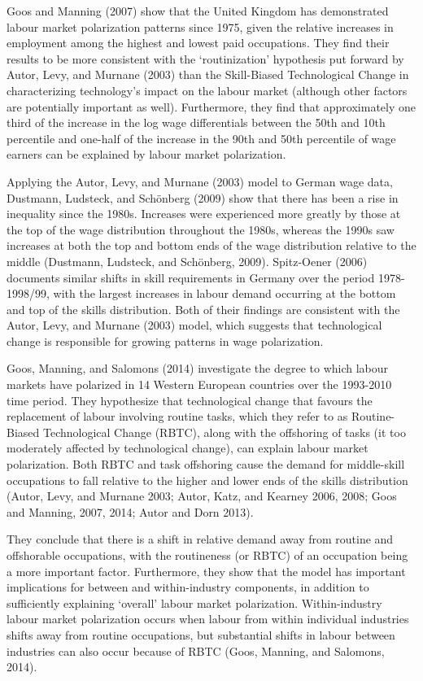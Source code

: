 \documentclass[undefended]{bumrp}
\begin{document}
Goos and Manning (2007) show that the United Kingdom has demonstrated labour market polarization patterns since 1975, given the relative increases in employment among the highest and lowest paid occupations. They find their results to be more consistent with the ‘routinization’ hypothesis put forward by Autor, Levy, and Murnane (2003) than the Skill-Biased Technological Change in characterizing technology’s impact on the labour market (although other factors are potentially important as well). Furthermore, they find that approximately one third of the increase in the log wage differentials between the 50th and 10th percentile and one-half of the increase in the 90th and 50th percentile of wage earners can be explained by labour market polarization.

Applying the Autor, Levy, and Murnane (2003) model to German wage data,  Dustmann, Ludsteck, and Schönberg (2009) show that there has been a rise in inequality since the 1980s. Increases were experienced more greatly by those at the top of the wage distribution throughout the 1980s, whereas the 1990s saw increases at both the top and bottom ends of the wage distribution relative to the middle (Dustmann, Ludsteck, and Schönberg, 2009). Spitz-Oener (2006) documents similar shifts in skill requirements in Germany over the period 1978-1998/99, with the largest increases in labour demand occurring at the bottom and top of the skills distribution. Both of their findings are consistent with the Autor, Levy, and Murnane (2003) model, which suggests that technological change is responsible for growing patterns in wage polarization.

Goos, Manning, and Salomons (2014) investigate the degree to which labour markets have polarized in 14 Western European countries over the 1993-2010 time period. They hypothesize that technological change that favours the replacement of labour involving routine tasks, which they refer to as Routine-Biased Technological Change (RBTC), along with the offshoring of tasks (it too moderately affected by technological change), can explain labour market polarization. Both RBTC and task offshoring cause the demand for middle-skill occupations to fall relative to the higher and lower ends of the skills distribution (Autor, Levy, and Murnane 2003; Autor, Katz, and Kearney 2006, 2008; Goos and Manning, 2007, 2014; Autor and Dorn 2013).

	They conclude that there is a shift in relative demand away from routine and offshorable occupations, with the routineness (or RBTC) of an occupation being a more important factor. Furthermore, they show that the model has important implications for between and within-industry components, in addition to sufficiently explaining ‘overall’ labour market polarization. Within-industry labour market polarization occurs when labour from within individual industries shifts away from routine occupations, but substantial shifts in labour between industries can also occur because of RBTC (Goos, Manning, and Salomons, 2014). 
\end{document}
